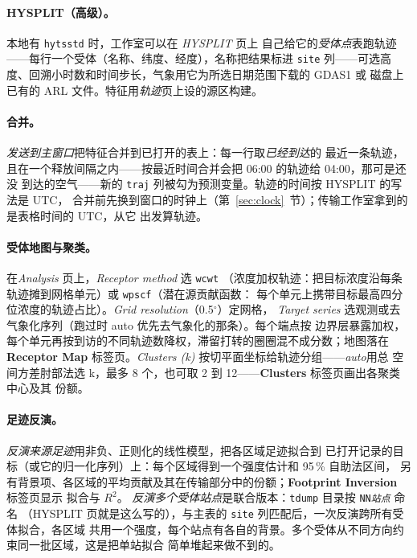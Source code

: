 \documentclass[11pt]{ctexrep}
\newcommand{\codeunderscore}{\textunderscore\allowbreak}
\newcommand{\code}[1]{\texttt{\let\_\codeunderscore #1}}
\newcommand{\tab}[1]{\textbf{#1}}
\begin{document}
\paragraph{HYSPLIT（高级）。}本地有 \code{hyts\_std} 时，工作室可以在 \emph{HYSPLIT} 页上
自己给它的\emph{受体点}表跑轨迹——每行一个受体（名称、纬度、经度），名称把结果标进
\code{site} 列——可选高度、回溯小时数和时间步长，气象用它为所选日期范围下载的 GDAS1 或
磁盘上已有的 ARL 文件。特征用\emph{轨迹}页上设的源区构建。

\paragraph{合并。}\emph{发送到主窗口}把特征合并到已打开的表上：每一行取\emph{已经到达}的
最近一条轨迹，且在一个释放间隔之内——按最近时间合并会把 06:00 的轨迹给 04:00，那可是还没
到达的空气——新的 \code{traj\_*} 列被勾为预测变量。轨迹的时间按 HYSPLIT 的写法是 UTC，
合并前先换到窗口的时钟上（第~\ref{sec:clock}~节）；传输工作室拿到的是表格时间的 UTC，从它
出发算轨迹。

\paragraph{受体地图与聚类。}在\emph{Analysis} 页上，\emph{Receptor method} 选 \code{wcwt}
（浓度加权轨迹：把目标浓度沿每条轨迹摊到网格单元）或 \code{wpscf}（潜在源贡献函数：
每个单元上携带目标最高四分位浓度的轨迹占比）。\emph{Grid resolution}（0.5$^\circ$）定网格，
\emph{Target series} 选观测或去气象化序列（跑过时 auto 优先去气象化的那条）。每个端点按
边界层暴露加权，每个单元再按到访的不同轨迹数降权，滞留打转的圈圈混不成分数；地图落在
\tab{Receptor Map} 标签页。\emph{Clusters (k)} 按切平面坐标给轨迹分组——\emph{auto}用总
空间方差肘部法选 k，最多 8 个，也可取 2 到 12——\tab{Clusters} 标签页画出各聚类中心及其
份额。

\paragraph{足迹反演。}\emph{反演来源足迹}用非负、正则化的线性模型，把各区域足迹拟合到
已打开记录的目标（或它的归一化序列）上：每个区域得到一个强度估计和 95\,\% 自助法区间，
另有背景项、各区域的平均贡献及其在传输部分中的份额；\tab{Footprint Inversion} 标签页显示
拟合与 $R^2$。
\emph{反演多个受体站点}是联合版本：\code{tdump} 目录按 \code{NN\_\emph{站点}} 命名
（HYSPLIT 页就是这么写的），与主表的 \code{site} 列匹配后，一次反演跨所有受体拟合，各区域
共用一个强度，每个站点有各自的背景。多个受体从不同方向约束同一批区域，这是把单站拟合
简单堆起来做不到的。
\end{document}
